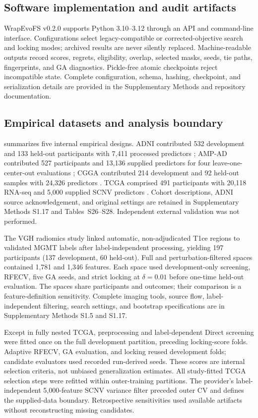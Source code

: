 \subsection{Software implementation and audit artifacts}

WrapEvoFS v0.2.0 supports Python 3.10--3.12 through an API and command-line interface. Configurations select legacy-compatible or corrected-objective search and locking modes; archived results are never silently replaced. Machine-readable outputs record scores, regrets, eligibility, overlap, selected masks, seeds, tie paths, fingerprints, and GA diagnostics. Pickle-free atomic checkpoints reject incompatible state. Complete configuration, schema, hashing, checkpoint, and serialization details are provided in the Supplementary Methods and repository documentation.

\subsection{Empirical datasets and analysis boundary}

 summarizes five internal empirical designs. ADNI contributed 532 development and 133 held-out participants with 7,411 processed predictors \citep{ref20,ref21}; AMP-AD contributed 527 participants and 13,136 supplied predictors for four leave-one-center-out evaluations \citep{ref37}; CGGA contributed 214 development and 92 held-out samples with 24,326 predictors \citep{ref23}. TCGA comprised 491 participants with 20,118 RNA-seq and 5,000 supplied SCNV predictors \citep{ref44,ref45}. Cohort descriptions, ADNI source acknowledgement, and original settings are retained in Supplementary Methods S1.17 and Tables~S26--S28. Independent external validation was not performed.

The VGH radiomics study linked automatic, non-adjudicated T1ce regions to validated MGMT labels after label-independent processing, yielding 197 participants (137 development, 60 held-out). Full and perturbation-filtered spaces contained 1,781 and 1,346 features. Each space used development-only screening, RFECV, five GA seeds, and strict locking at $\delta=0.01$ before one-time held-out evaluation. The spaces share participants and outcomes; their comparison is a feature-definition sensitivity. Complete imaging tools, source flow, label-independent filtering, search settings, and bootstrap specifications are in Supplementary Methods S1.5 and S1.17.

Except in fully nested TCGA, preprocessing and label-dependent Direct screening were fitted once on the full development partition, preceding locking-score folds. Adaptive RFECV, GA evaluation, and locking reused development folds; candidate evaluators used recorded run-derived seeds. These scores are internal selection criteria, not unbiased generalization estimates. All study-fitted TCGA selection steps were refitted within outer-training partitions. The provider's label-independent 5,000-feature SCNV variance filter preceded outer CV and defines the supplied-data boundary. Retrospective sensitivities used available artifacts without reconstructing missing candidates.


